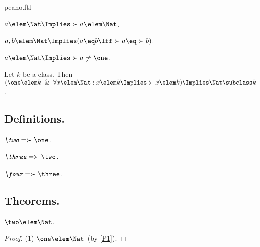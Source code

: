 \documentclass{article}
\begin{document}
\begin{smodule}{peano.ftl}
\begin{forthel}
  \begin{axiom*}[title=6,id=P6]
    $a \elem \Nat \Implies \succ{a} \elem \Nat$.
  \end{axiom*}
  
  \begin{axiom*}[title=7,id=P7]
    $a,b \elem \Nat \Implies (a \eq b \Iff \succ{a} \eq \succ{b})$.
  \end{axiom*}
  
  \begin{axiom*}[title=8,id=P8]
    $a \elem \Nat \Implies \succ{a} \neq \one$.
  \end{axiom*}
  
  \begin{axiom*}[title=9,id=P9]
    Let $k$ be a class.
    Then $(\one \elem k \And \forall x \elem \Nat: x \elem k \Implies \succ{x} \elem k) \Implies \Nat \subclass k$.
  \end{axiom*}
\end{forthel}


\subsection{Definitions.}

\begin{forthel}
  \begin{definition*}[title=10.i,id=P10_1]
    $\emph{\two} = \succ{\one}$.
  \end{definition*}

  \begin{definition*}[title=10.ii,id=P10_2]
    $\emph{\three} = \succ{\two}$.
  \end{definition*}
  
  \begin{definition*}[title=10.iii,id=P10_3]
    $\emph{\four} = \succ{\three}$.
  \end{definition*}
\end{forthel}


\subsection{Theorems.}

\begin{forthel}
  \begin{theorem*}[title=11,id=P11]
    $\two \elem \Nat$.
  \end{theorem*}
  \begin{proof}
    (1) $\one \elem \Nat$ (by \ref{P1}).


\end{proof}
\end{forthel}
\end{smodule}
\end{document}

